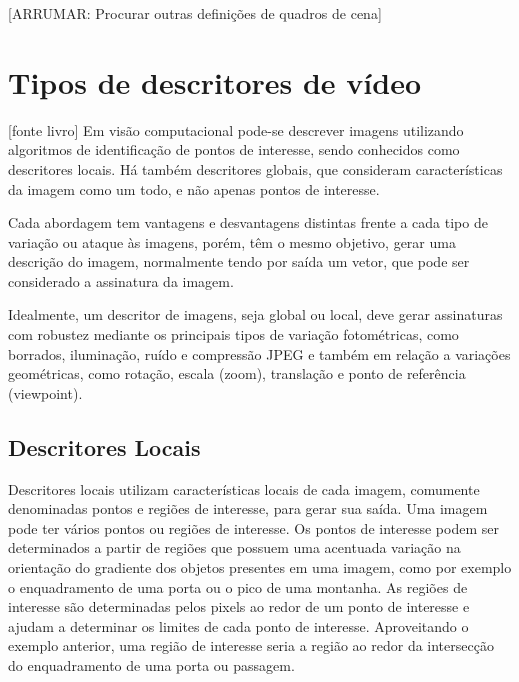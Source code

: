        [ARRUMAR: Procurar outras definições de quadros de cena]
        
        \section{Tipos de descritores de vídeo}
        \label{sec:tiposdescritores}
        

[fonte livro]
Em visão computacional pode-se descrever imagens utilizando algoritmos de identificação de pontos de interesse, sendo conhecidos como descritores locais. Há também descritores globais, que consideram características da imagem como um todo, e não apenas pontos de interesse.

Cada abordagem tem vantagens e desvantagens distintas frente a cada tipo de variação ou ataque às imagens, porém, têm o mesmo objetivo, gerar uma descrição do imagem, normalmente tendo por saída um vetor, que pode ser considerado a assinatura da imagem. 

Idealmente, um descritor de imagens, seja global ou local, deve gerar assinaturas com robustez mediante os principais tipos de variação fotométricas, como borrados, iluminação, ruído e compressão JPEG e também em relação a variações geométricas, como rotação, escala (zoom), translação e ponto de referência (viewpoint).

\subsection{Descritores Locais}
\label{subsec:descritores locais}

Descritores locais utilizam características locais de cada imagem, comumente denominadas pontos e regiões de interesse, para gerar sua saída. Uma imagem pode ter vários pontos ou regiões de interesse. Os pontos de interesse podem ser determinados a partir de regiões que possuem uma acentuada variação na orientação do gradiente dos objetos presentes em uma imagem, como por exemplo o enquadramento de uma porta ou o pico de uma montanha. As regiões de interesse são determinadas pelos pixels ao redor de um ponto de interesse e ajudam a determinar os limites de cada ponto de interesse. Aproveitando o exemplo anterior, uma região de interesse seria a região ao redor da intersecção do enquadramento de uma porta ou passagem.

